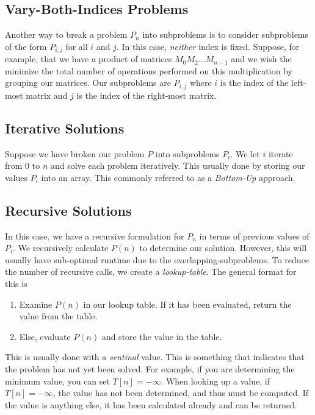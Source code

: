 \documentclass[a4paper]{article}
\theoremstyle{definition}
\begin{document}
\subsection{Vary-Both-Indices Problems}
Another way to break a problem $P_n$ into subproblems is to consider subproblems of the form $P_{i,j}$ for all $i$ and $j$. In this case, \textit{neither} index is fixed. Suppose, for example, that we have a product of matrices $M_0M_2\hdots M_{n-1}$ and we wish the minimize the total number of operations performed on this multiplication by grouping our matrices. Our subproblems are $P_{i,j}$ where $i$ is the index of the left-most matrix and $j$ is the index of the right-most matrix.
\subsection{Iterative Solutions}
Suppose we have broken our problem $P$ into subproblems $P_{i}$. We let $i$ iterate from $0$ to $n$ and solve each problem iteratively. This usually done by storing our values $P_i$ into an array. This commonly referred to as a \textit{Bottom-Up} approach.
\subsection{Recursive Solutions}
In this case, we have a recursive formulation for $P_n$ in terms of previous values of $P_i$. We recursively calculate $P(n)$ to determine our solution. However, this will usually have sub-optimal runtime due to the overlapping-subproblems. To reduce the number of recursive calls, we create a \textit{lookup-table}. The general format for this is 
\begin{enumerate}
 \item Examine $P(n)$ in our lookup table. If it has been evaluated, return the value from the table.
 \item Else, evaluate $P(n)$ and store the value in the table.
\end{enumerate}

This is usually done with a \textit{sentinal} value. This is something that indicates that the problem has not yet been solved. For example, if you are determining the minimum value, you can set $T[n]=-\infty$. When looking up a value, if $T[n]=-\infty$, the value has not been determined, and thus must be computed. If the value is anything else, it has been calculated already and can be returned.
\end{document}
